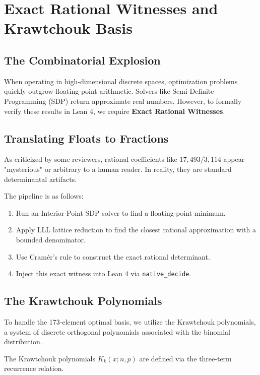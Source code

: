 \chapter{Exact Rational Witnesses and Krawtchouk Basis}

\section{The Combinatorial Explosion}

When operating in high-dimensional discrete spaces, optimization problems quickly outgrow floating-point arithmetic. Solvers like Semi-Definite Programming (SDP) return approximate real numbers. However, to formally verify these results in Lean 4, we require \textbf{Exact Rational Witnesses}.

\section{Translating Floats to Fractions}

As criticized by some reviewers, rational coefficients like $17,493/3,114$ appear "mysterious" or arbitrary to a human reader. In reality, they are standard determinantal artifacts.

The pipeline is as follows:
\begin{enumerate}
    \item Run an Interior-Point SDP solver to find a floating-point minimum.
    \item Apply LLL lattice reduction to find the closest rational approximation with a bounded denominator.
    \item Use Cramér's rule to construct the exact rational determinant.
    \item Inject this exact witness into Lean 4 via \texttt{native\_decide}.
\end{enumerate}

\section{The Krawtchouk Polynomials}

To handle the 173-element optimal basis, we utilize the Krawtchouk polynomials, a system of discrete orthogonal polynomials associated with the binomial distribution.

\begin{definition}
The Krawtchouk polynomials $K_k(x; n, p)$ are defined via the three-term recurrence relation.
\end{definition}

